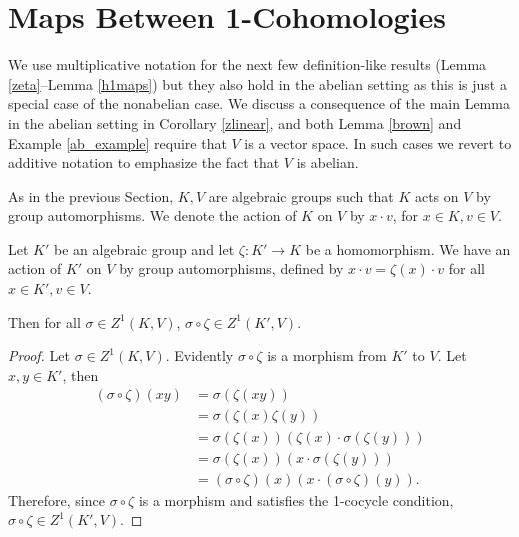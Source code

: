\section{Maps Between 1-Cohomologies}

We use multiplicative notation for the next few definition-like results (Lemma \ref{zeta}--Lemma \ref{h1maps}) but they also hold in the abelian setting as this is just a special case of the nonabelian case. We discuss a consequence of the main Lemma in the abelian setting in Corollary \ref{zlinear}, and both Lemma \ref{brown} and Example \ref{ab_example} require that $V$ is a vector space. In such cases we revert to additive notation to emphasize the fact that $V$ is abelian.

As in the previous Section, $K, V$ are algebraic groups such that $K$ acts on $V$ by group automorphisms. We denote the action of $K$ on $V$ by $x \cdot v$, for $x \in K, v \in V$.

\begin{lemma} \label{zeta}
	Let $K'$ be an algebraic group and let $\zeta:K'\rightarrow K$ be a homomorphism. We have an action of $K'$ on $V$ by group automorphisms, defined by $x \cdot v = \zeta(x) \cdot v$ for all $x \in K', v \in V$.

	Then for all $\sigma \in Z^1(K, V)$, $\sigma \circ \zeta \in Z^1(K', V)$.
\end{lemma}
\begin{proof}
	Let $\sigma \in Z^1(K, V)$. Evidently $\sigma \circ \zeta$ is a morphism from $K'$ to $V$. Let $x, y \in K'$, then
	\begin{align*}
		(\sigma \circ \zeta)(xy) &= \sigma\left(\zeta(xy)\right) \\
			&= \sigma\left(\zeta(x)\zeta(y)\right) \\
			&= \sigma(\zeta(x))\left(\zeta(x) \cdot \sigma(\zeta(y))\right) \\
			&= \sigma(\zeta(x))\left(x \cdot \sigma(\zeta(y))\right) \\
			&= (\sigma\circ\zeta)(x)\left(x \cdot (\sigma\circ\zeta)(y)\right).
	\end{align*}
	Therefore, since $\sigma \circ \zeta$ is a morphism and satisfies the 1-cocycle condition, $\sigma \circ \zeta \in Z^1(K', V)$.
\end{proof}

